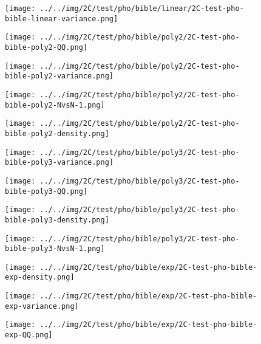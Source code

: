 \begin{figure}[H]
\centering	\texttt{[image: ../../img/2C/test/pho/bible/linear/2C-test-pho-bible-linear-variance.png]}
\end{figure}
\begin{figure}[H]
\centering	\texttt{[image: ../../img/2C/test/pho/bible/poly2/2C-test-pho-bible-poly2-QQ.png]}
\end{figure}
\begin{figure}[H]
\centering	\texttt{[image: ../../img/2C/test/pho/bible/poly2/2C-test-pho-bible-poly2-variance.png]}
\end{figure}
\begin{figure}[H]
\centering	\texttt{[image: ../../img/2C/test/pho/bible/poly2/2C-test-pho-bible-poly2-NvsN-1.png]}
\end{figure}
\begin{figure}[H]
\centering	\texttt{[image: ../../img/2C/test/pho/bible/poly2/2C-test-pho-bible-poly2-density.png]}
\end{figure}
\begin{figure}[H]
\centering	\texttt{[image: ../../img/2C/test/pho/bible/poly3/2C-test-pho-bible-poly3-variance.png]}
\end{figure}
\begin{figure}[H]
\centering	\texttt{[image: ../../img/2C/test/pho/bible/poly3/2C-test-pho-bible-poly3-QQ.png]}
\end{figure}
\begin{figure}[H]
\centering	\texttt{[image: ../../img/2C/test/pho/bible/poly3/2C-test-pho-bible-poly3-density.png]}
\end{figure}
\begin{figure}[H]
\centering	\texttt{[image: ../../img/2C/test/pho/bible/poly3/2C-test-pho-bible-poly3-NvsN-1.png]}
\end{figure}
\begin{figure}[H]
\centering	\texttt{[image: ../../img/2C/test/pho/bible/exp/2C-test-pho-bible-exp-density.png]}
\end{figure}
\begin{figure}[H]
\centering	\texttt{[image: ../../img/2C/test/pho/bible/exp/2C-test-pho-bible-exp-variance.png]}
\end{figure}
\begin{figure}[H]
\centering	\texttt{[image: ../../img/2C/test/pho/bible/exp/2C-test-pho-bible-exp-QQ.png]}
\end{figure}
